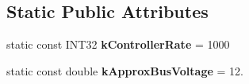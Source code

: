 \subsection*{\-Static \-Public \-Attributes}
\begin{DoxyCompactItemize}
\item 
\hypertarget{classCANJaguar_ad495131fc2f4345f5bb291b46cb10418}{static const \-I\-N\-T32 {\bfseries k\-Controller\-Rate} = 1000}\label{classCANJaguar_ad495131fc2f4345f5bb291b46cb10418}

\item 
\hypertarget{classCANJaguar_a20754925d6f0f3b20063fd469c275a54}{static const double {\bfseries k\-Approx\-Bus\-Voltage} = 12.}\label{classCANJaguar_a20754925d6f0f3b20063fd469c275a54}

\end{DoxyCompactItemize}
